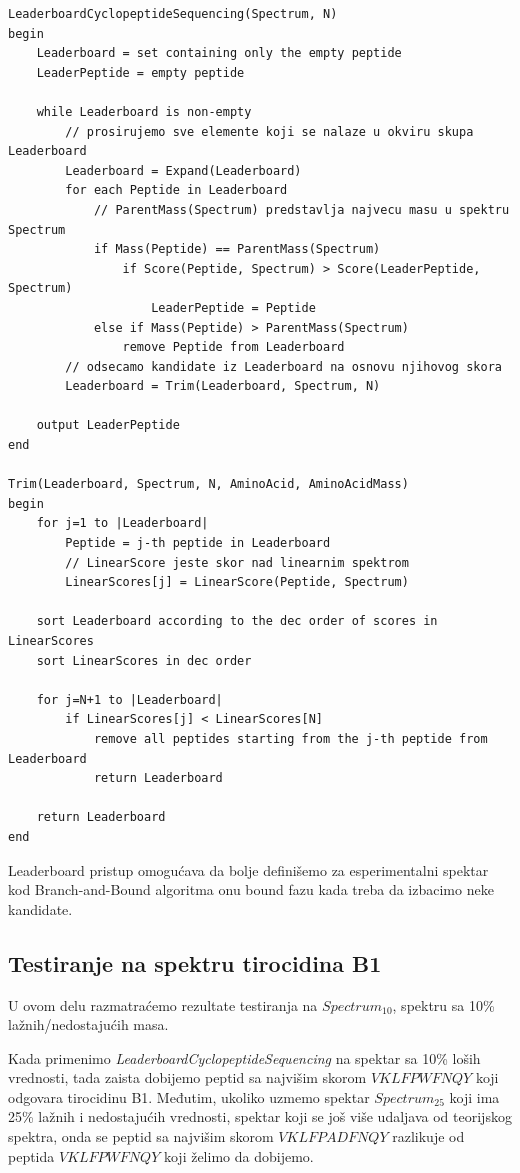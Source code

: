 \begin{lstlisting}
LeaderboardCyclopeptideSequencing(Spectrum, N)
begin
	Leaderboard = set containing only the empty peptide
	LeaderPeptide = empty peptide
	
	while Leaderboard is non-empty
		// prosirujemo sve elemente koji se nalaze u okviru skupa Leaderboard
		Leaderboard = Expand(Leaderboard)
		for each Peptide in Leaderboard
			// ParentMass(Spectrum) predstavlja najvecu masu u spektru Spectrum
			if Mass(Peptide) == ParentMass(Spectrum)
				if Score(Peptide, Spectrum) > Score(LeaderPeptide, Spectrum)
					LeaderPeptide = Peptide
			else if Mass(Peptide) > ParentMass(Spectrum)
				remove Peptide from Leaderboard
		// odsecamo kandidate iz Leaderboard na osnovu njihovog skora
		Leaderboard = Trim(Leaderboard, Spectrum, N)
		
	output LeaderPeptide
end

Trim(Leaderboard, Spectrum, N, AminoAcid, AminoAcidMass)
begin
	for j=1 to |Leaderboard|
		Peptide = j-th peptide in Leaderboard
		// LinearScore jeste skor nad linearnim spektrom
		LinearScores[j] = LinearScore(Peptide, Spectrum)
		
	sort Leaderboard according to the dec order of scores in LinearScores
	sort LinearScores in dec order
	
	for j=N+1 to |Leaderboard|
		if LinearScores[j] < LinearScores[N]
			remove all peptides starting from the j-th peptide from Leaderboard
			return Leaderboard
			
	return Leaderboard
end
\end{lstlisting}

\noindent Leaderboard pristup omogućava da bolje definišemo za esperimentalni spektar kod Branch-and-Bound algoritma onu bound fazu kada treba da izbacimo neke kandidate. 

\subsection{Testiranje na spektru tirocidina B1}

U ovom delu razmatraćemo rezultate testiranja na $Spectrum_{10}$, spektru sa 10\% lažnih/nedostajućih masa. 

Kada primenimo \textit{LeaderboardCyclopeptideSequencing} na spektar sa 10\% loših vrednosti, tada zaista dobijemo peptid sa najvišim skorom $ VKLFPWFNQY $  koji odgovara tirocidinu B1. Međutim, ukoliko uzmemo spektar $Spectrum_{25}$ koji ima 25\% lažnih i nedostajućih vrednosti, spektar koji se još više udaljava od teorijskog spektra, onda se peptid sa najvišim skorom $ VKLFPADFNQY $ razlikuje od peptida  $ VKLFPWFNQY $ koji želimo da dobijemo.

